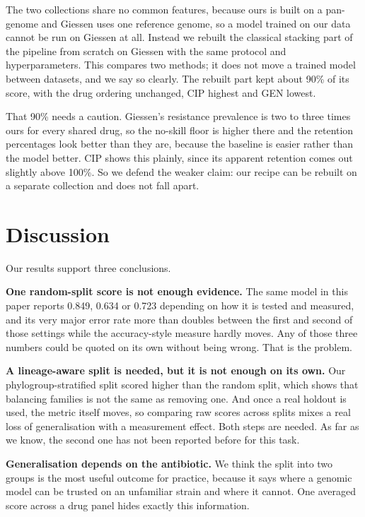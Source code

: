 \documentclass[conference]{IEEEtran}
\begin{document}
The two collections share no common features, because ours is built on a pan-genome
and Giessen uses one reference genome, so a model trained on our data cannot be run
on Giessen at all. Instead we rebuilt the classical stacking part of the pipeline
from scratch on Giessen with the same protocol and hyperparameters. This compares
two methods; it does not move a trained model between datasets, and we say so
clearly. The rebuilt part kept about 90\% of its score, with the drug ordering
unchanged, CIP highest and GEN lowest.

That 90\% needs a caution. Giessen's resistance prevalence is two to three times
ours for every shared drug, so the no-skill floor is higher there and the retention
percentages look better than they are, because the baseline is easier rather than
the model better. CIP shows this plainly, since its apparent retention comes out
slightly above 100\%. So we defend the weaker claim: our recipe can be rebuilt on a
separate collection and does not fall apart.

\section{Discussion}
\label{sec:discussion}

Our results support three conclusions.

\textbf{One random-split score is not enough evidence.} The same model in this paper
reports 0.849, 0.634 or 0.723 depending on how it is tested and measured, and its
very major error rate more than doubles between the first and second of those
settings while the accuracy-style measure hardly moves. Any of those three numbers
could be quoted on its own without being wrong. That is the problem.

\textbf{A lineage-aware split is needed, but it is not enough on its own.} Our
phylogroup-stratified split scored higher than the random split, which shows that
balancing families is not the same as removing one. And once a real holdout is used,
the metric itself moves, so comparing raw scores across splits mixes a real loss of
generalisation with a measurement effect. Both steps are needed. As far as we know,
the second one has not been reported before for this task.

\textbf{Generalisation depends on the antibiotic.} We think the split into two
groups is the most useful outcome for practice, because it says where a genomic
model can be trusted on an unfamiliar strain and where it cannot. One averaged score
across a drug panel hides exactly this information.
\end{document}
